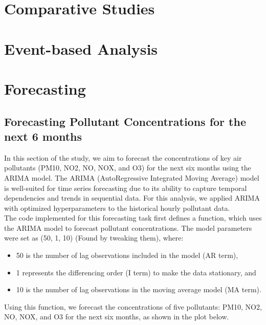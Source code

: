 \documentclass{modeleRapport}
\begin{document}
\section{Comparative Studies}



\section{Event-based Analysis}




\newpage
\section{Forecasting}

\subsection{Forecasting Pollutant Concentrations for the next 6 months}

In this section of the study, we aim to forecast the concentrations of key air pollutants (PM10, NO2, NO, NOX, and O3) 
for the next six months using the ARIMA model. The ARIMA (AutoRegressive Integrated Moving Average) model is well-suited 
for time series forecasting due to its ability to capture temporal dependencies and trends in sequential data. For 
this analysis, we applied ARIMA with optimized hyperparameters to the historical hourly pollutant data.\\

The code implemented for this forecasting task first defines a function, which uses the ARIMA model to 
forecast pollutant concentrations. The model parameters were set as (50, 1, 10) (Found by tweaking them), where:\\

\begin{itemize}
    \item 50 is the number of lag observations included in the model (AR term),
    \item 1 represents the differencing order (I term) to make the data stationary, and
    \item 10 is the number of lag observations in the moving average model (MA term).\\
\end{itemize}

Using this function, we forecast the concentrations of five pollutants: PM10, NO2, NO, NOX, and O3 for the next six months, 
as shown in the plot below.
\end{document}
